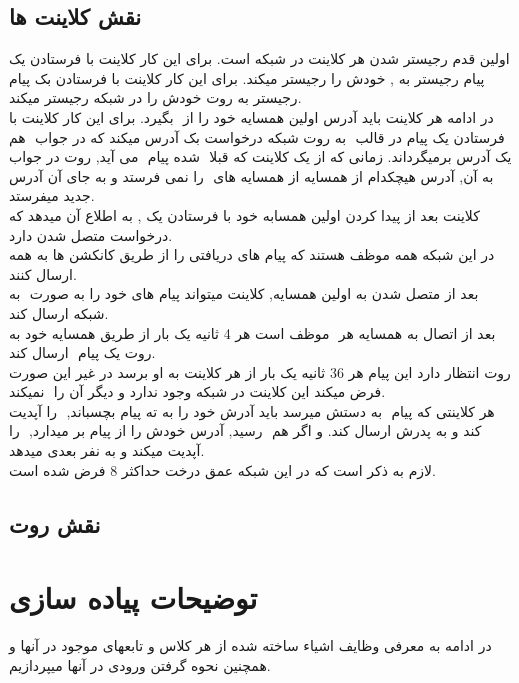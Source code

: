 \documentclass{article}
\begin{document}
	\subsection{نقش کلاینت ها}
اولین قدم رجیستر شدن هر کلاینت در شبکه است. برای این کار کلاینت با فرستادن یک پیام رجیستر به ‌, خودش را رجیستر میکند. برای این کار کلاینت با فرستادن بک پیام رجیستر به روت خودش را در شبکه رجیستر میکند.\\
در ادامه هر کلاینت باید آدرس اولین همسایه خود را از ‌ بگیرد. برای این کار کلاینت با فرستادن یک پیام در قالب ‌ به روت شبکه درخواست بک آدرس میکند که در جواب ‌ هم یک آدرس برمیگرداند. زمانی که از یک کلاینت که قبلا ‌ شده پیام ‌ می آید, روت در جواب به آن, آدرس هیچکدام از همسایه از همسایه های ‌ را نمی فرستد و به جای آن آدرس جدید میفرستد.\\
کلاینت بعد از پیدا کردن اولین همسابه خود با فرستادن یک ‌, به اطلاع آن میدهد که درخواست متصل شدن دارد.\\
در این شبکه همه موظف هستند که پیام های دریافتی را از طریق کانکشن ها به همه ارسال کنند.\\
بعد از متصل شدن به اولین همسایه, کلاینت میتواند پیام های خود را به صورت ‌ به شبکه ارسال کند.\\
بعد از اتصال به همسایه هر ‌ موظف است هر 4 ثانیه یک بار از طریق همسایه خود به روت یک پیام ‌ ارسال کند.\\
روت انتظار دارد این پیام هر 36 ثانیه یک بار از هر کلاینت به او برسد در غیر این صورت فرض میکند این کلاینت در شبکه وجود ندارد و دیگر آن را ‌ نمیکند.\\
هر کلاینتی که پیام ‌ به دستش میرسد باید آدرش خود را به ته پیام بچسباند, ‌ را آپدیت کند و به پدرش ارسال کند. و اگر هم ‌ رسید, آدرس خودش را از پیام بر میدارد, ‌ را آپدیت میکند و به نفر بعدی میدهد.\\
لازم به ذکر است که در این شبکه عمق درخت حداکثر 8 فرض شده است.\\
	\subsection{نقش روت}


    \section{توضیحات پیاده سازی}
در ادامه به معرفی وظایف اشیاء ساخته شده از هر کلاس و تابعهای موجود در آنها و همچنین نحوه گرفتن ورودی در آنها میپردازیم.
\end{document}
